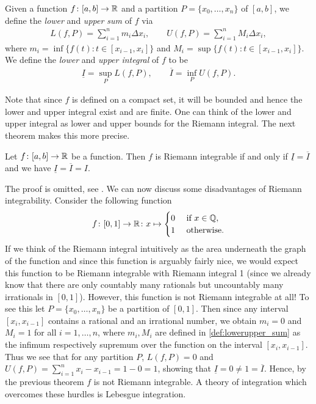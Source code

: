 \documentclass{article}
\begin{document}
\begin{definition}\label{def:lowerupper_sum}
Given a function $f\colon [a,b] \to {\mathbb{R}}$ and a partition $P = \{x_0,\ldots, x_n\}$ of $[a,b]$, we define the \emph{lower} and \emph{upper sum} of $f$ via \begin{align*}
    L(f,P) = \sum_{i=1}^n m_i \Delta x_i, \qquad U(f,P) =\sum_{i=1}^n M_i \Delta x_i,
\end{align*}
where $m_i = \inf \{f(t) \colon t\in [x_{i-1}, x_i]\}$ and $M_i = \sup \{f(t) \colon t\in [x_{i-1}, x_i]\}$. We define the \emph{lower} and \emph{upper integral} of $f$ to be
\begin{align*}
    \underline{I} = \sup_P L(f,P), \qquad \overline{I} = \inf_P U(f,P).
\end{align*}
\end{definition}
Note that since $f$ is defined on a compact set, it will be bounded and hence the lower and upper integral exist and are finite. One can think of the lower and upper integral as lower and upper bounds for the Riemann integral. The next theorem makes this more precise. 

\begin{theorem}
Let $f\colon [a,b] \to {\mathbb{R}}$ be a function. Then $f$ is Riemann integrable if and only if $\underline{I} = \overline{I}$ and we have $\underline{I} = \overline{I} = I$.
\end{theorem}

The proof is omitted, see \cite[Theorem 20, p.167]{realanalysis}. We can now discuss some disadvantages of Riemann integrability. Consider the following function
\begin{equation*}
    f \colon [0,1] \to {\mathbb{R}} \colon x\mapsto \begin{cases} 0 &\text{ if } x\in {\mathbb{Q}},\\
    1 &\text{ otherwise}.
    \end{cases}
\end{equation*}
If we think of the Riemann integral intuitively as the area underneath the graph of the function and since this function is arguably fairly nice, we would expect this function to be Riemann integrable with Riemann integral 1 (since we already know that there are only countably many rationals but uncountably many irrationals in $[0,1]$). However, this function is not Riemann integrable at all! To see this let $P=\{x_0,\ldots, x_n\}$ be a partition of $[0,1]$. Then since any interval $[x_{i}, x_{i-1}]$ contains a rational and an irrational number, we obtain $m_i=0$ and $M_i=1$ for all $i=1,\ldots, n$, where $m_i,M_i$ are defined in \cref{def:lowerupper_sum} as the infimum respectively supremum over the function on the interval $[x_{i}, x_{i-1}]$. Thus we see that for any partition $P$, $L(f,P) = 0$ and $U(f,P) =\sum_{i=1}^n x_{i} - x_{i-1} = 1-0 = 1$, showing that $\underline{I} = 0 \neq 1 = \overline{I}$. Hence, by the previous theorem $f$ is not Riemann integrable. A theory of integration which overcomes these hurdles is Lebesgue integration.
\end{document}
